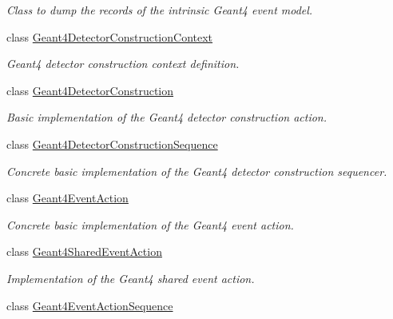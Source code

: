 \begin{DoxyCompactItemize}
\begin{DoxyCompactList}\small\item\em Class to dump the records of the intrinsic Geant4 event model. \item\end{DoxyCompactList}\item 
class \hyperlink{class_d_d4hep_1_1_simulation_1_1_geant4_detector_construction_context}{Geant4DetectorConstructionContext}
\begin{DoxyCompactList}\small\item\em Geant4 detector construction context definition. \item\end{DoxyCompactList}\item 
class \hyperlink{class_d_d4hep_1_1_simulation_1_1_geant4_detector_construction}{Geant4DetectorConstruction}
\begin{DoxyCompactList}\small\item\em Basic implementation of the Geant4 detector construction action. \item\end{DoxyCompactList}\item 
class \hyperlink{class_d_d4hep_1_1_simulation_1_1_geant4_detector_construction_sequence}{Geant4DetectorConstructionSequence}
\begin{DoxyCompactList}\small\item\em Concrete basic implementation of the Geant4 detector construction sequencer. \item\end{DoxyCompactList}\item 
class \hyperlink{class_d_d4hep_1_1_simulation_1_1_geant4_event_action}{Geant4EventAction}
\begin{DoxyCompactList}\small\item\em Concrete basic implementation of the Geant4 event action. \item\end{DoxyCompactList}\item 
class \hyperlink{class_d_d4hep_1_1_simulation_1_1_geant4_shared_event_action}{Geant4SharedEventAction}
\begin{DoxyCompactList}\small\item\em Implementation of the Geant4 shared event action. \item\end{DoxyCompactList}\item 
class \hyperlink{class_d_d4hep_1_1_simulation_1_1_geant4_event_action_sequence}{Geant4EventActionSequence}

\end{DoxyCompactItemize}

